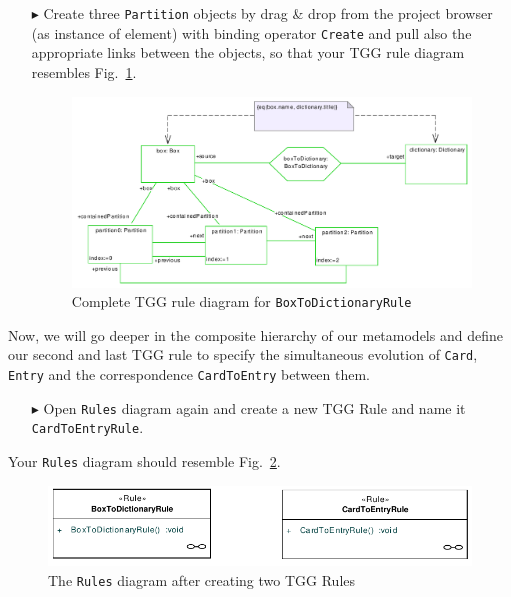 \begin{enumerate}
\item[$\blacktriangleright$] Create three \texttt{Partition} objects by drag \& drop from the project browser (as instance of element) with binding operator \texttt{Create} and pull also the appropriate links between the objects, so that your TGG rule diagram resembles Fig.~\ref{fig:boxtodictionaryrule_complete}.

\begin{figure}[htbp]
\begin{center}
  \includegraphics[width=\textwidth]{pics/tggBilder/tggRule/tgg15}
  \caption{Complete TGG rule diagram for \texttt{BoxToDictionaryRule}}  
  \label{fig:boxtodictionaryrule_complete}
\end{center}
\end{figure}

\end{enumerate}

Now, we will go deeper in the composite hierarchy of our metamodels and define our second and last TGG rule to specify the simultaneous evolution of \texttt{Card}, \texttt{Entry} and the correspondence \texttt{CardToEntry} between them.

\begin{enumerate}
\item[$\blacktriangleright$] Open \texttt{Rules} diagram again and create a new TGG Rule and name it \texttt{CardToEntryRule}.
\end{enumerate}

Your \texttt{Rules} diagram should resemble Fig.~\ref{fig:rules_diagram}.

\begin{figure}[htbp]
\begin{center}
  \includegraphics[width=\textwidth]{pics/tggBilder/tggRule/tgg16}
  \caption{The \texttt{Rules} diagram after creating two TGG Rules}  
  \label{fig:rules_diagram}
\end{center}
\end{figure}

